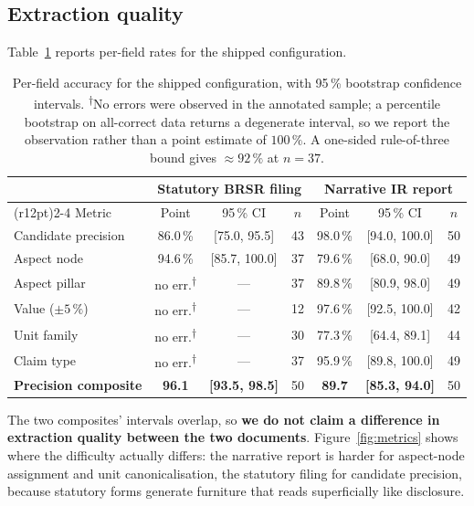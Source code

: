 \documentclass[3p,times]{elsarticle}
\newcommand{\noerr}{\textsuperscript{$\dagger$}}
\begin{document}
\subsection{Extraction quality}

Table~\ref{tab:metrics} reports per-field rates for the shipped configuration.

\begin{table}[t]
\centering
\caption{Per-field accuracy for the shipped configuration, with 95\,\% bootstrap
confidence intervals. \noerr{}No errors were observed in the annotated sample; a
percentile bootstrap on all-correct data returns a degenerate interval, so we
report the observation rather than a point estimate of $100\,\%$. A one-sided
rule-of-three bound gives $\approx\!92\,\%$ at $n=37$.}
\label{tab:metrics}
\begin{tabular}{lccc@{\hskip 18pt}ccc}
\toprule
& \multicolumn{3}{c}{\textbf{Statutory BRSR filing}} & \multicolumn{3}{c}{\textbf{Narrative IR report}}\\
\cmidrule(r{12pt}){2-4}\cmidrule{5-7}
Metric & Point & 95\,\% CI & $n$ & Point & 95\,\% CI & $n$\\
\midrule
Candidate precision & 86.0\,\% & [75.0, 95.5] & 43 & 98.0\,\% & [94.0, 100.0] & 50\\
Aspect node         & 94.6\,\% & [85.7, 100.0] & 37 & 79.6\,\% & [68.0, 90.0] & 49\\
Aspect pillar       & no err.\noerr & --- & 37 & 89.8\,\% & [80.9, 98.0] & 49\\
Value ($\pm5\,\%$)  & no err.\noerr & --- & 12 & 97.6\,\% & [92.5, 100.0] & 42\\
Unit family         & no err.\noerr & --- & 30 & 77.3\,\% & [64.4, 89.1] & 44\\
Claim type          & no err.\noerr & --- & 37 & 95.9\,\% & [89.8, 100.0] & 49\\
\midrule
\textbf{Precision composite} & \textbf{96.1} & \textbf{[93.5, 98.5]} & 50 & \textbf{89.7} & \textbf{[85.3, 94.0]} & 50\\
\bottomrule
\end{tabular}
\end{table}

The two composites' intervals overlap, so \textbf{we do not claim a difference in
extraction quality between the two documents}. Figure~\ref{fig:metrics} shows
where the difficulty actually differs: the narrative report is harder for
aspect-node assignment and unit canonicalisation, the statutory filing for
candidate precision, because statutory forms generate furniture that reads
superficially like disclosure.
\end{document}
